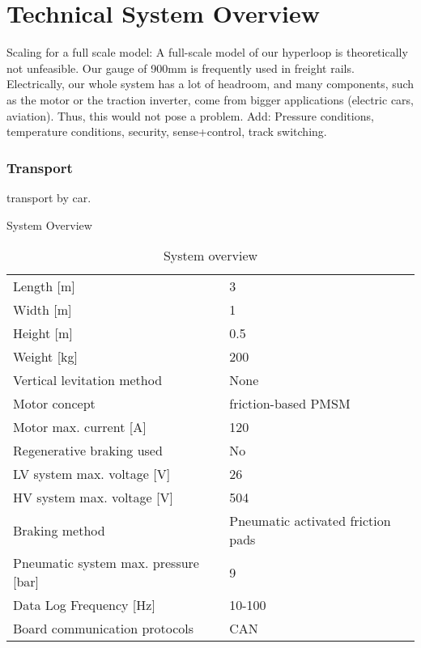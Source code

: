 \chapter{Technical System Overview}

Scaling for a full scale model:
A full-scale model of our hyperloop is theoretically not unfeasible. Our gauge of 900mm is frequently used in freight rails. Electrically, our whole system has a lot of headroom, and many components, such as the motor or the traction inverter, come from bigger applications (electric cars, aviation). Thus, this would not pose a problem. 
Add: Pressure conditions, temperature conditions, security, sense+control, track switching.

\subsection{Transport}
transport by car.

\begin{table}[htbp]
\centering
\caption{System Overview}
\begin{tabular}{|l|l|}
\hline
Length [m] & 3 \\
Width [m] & 1 \\
Height [m] & 0.5 \\
Weight [kg] & 200 \\
Vertical levitation method & None \\
Motor concept & friction-based PMSM \\
Motor max. current [A] & 120 \\
Regenerative braking used & No \\
LV system max. voltage [V] & 26 \\
HV system max. voltage [V] & 504 \\
Braking method & Pneumatic activated friction pads \\
Pneumatic system max. pressure [bar] & 9 \\
Data Log Frequency [Hz] & 10-100 \\
Board communication protocols & CAN \\
\hline
\end{tabular}
\caption{System overview}
\label{tab: system-overview}
\end{table}
